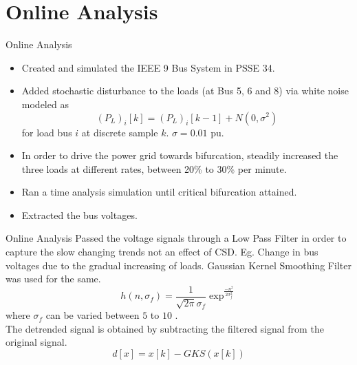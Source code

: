 \section[Online Analysis]{Online Analysis}
\label{sec:online}

\begin{frame}{Online Analysis}
	\begin{itemize}
		\item Created and simulated the IEEE 9 Bus System in PSSE 34.
		\item Added stochastic disturbance to the loads (at Bus 5, 6 and 8) via white noise modeled as
			\begin{equation}
				(P_L)_{i}[k] = (P_L)_{i}[k-1] + N(0, \sigma^2)
			\end{equation}
		for load bus $i$ at discrete sample $k$.
		$\sigma = 0.01$ pu. 	
		\item In order to drive the power grid towards bifurcation, steadily increased the three loads at different rates, between 20\% to 30\% per minute.
		\item Ran a time analysis simulation until critical bifurcation attained. 
		\item Extracted the bus voltages. 
	\end{itemize}

\end{frame}

\begin{frame}{Online Analysis}
	Passed the voltage signals through a Low Pass Filter in order to capture the slow changing trends not an effect of CSD. 
	Eg. Change in bus voltages due to the gradual increasing of loads.
	Gaussian Kernel Smoothing Filter was used for the same.
	\begin{equation}
	\label{eq:gks}
		h(n, \sigma_f) = \frac{1}{\sqrt{2 \pi} \sigma_f} \exp^\frac{-n^2}{2 \sigma_f^2}
	\end{equation}
	where $\sigma_f$ can be varied between $5$ to $10$ .
	\\ The detrended signal is obtained by subtracting the filtered signal from the original signal.	
	\begin{equation}
	\label{eq:detrending}
		d[x] = x[k] - GKS(x[k])
	\end{equation} 
\end{frame}

